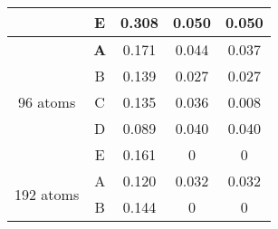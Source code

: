 \begin{table}[H]
\begin{tabular}{@{}ccccc@{}}
\multicolumn{1}{c|}{}                     & E          & 0.308                                                                         & 0.050                                                                         & 0.050                                                                          \\ \midrule
\multicolumn{1}{c|}{\multirow{5}{*}{96 atoms}}  & \textbf{A} & 0.171                                                                         & 0.044                                                                         & 0.037                                                                          \\
\multicolumn{1}{c|}{}                     & B          & 0.139                                                                         & 0.027                                                                         & 0.027                                                                          \\
\multicolumn{1}{c|}{}                     & C          & 0.135                                                                         & 0.036                                                                         & 0.008                                                                          \\
\multicolumn{1}{c|}{}                     & D          & 0.089                                                                         & 0.040                                                                         & 0.040                                                                          \\
\multicolumn{1}{c|}{}                     & E          & 0.161                                                                         & 0                                                                              & 0                                                                               \\ \midrule
\multicolumn{1}{c|}{\multirow{5}{*}{192 atoms}} & A          & 0.120                                                                         & 0.032                                                                         & 0.032                                                                          \\
\multicolumn{1}{c|}{}                     & B          & 0.144                                                                         & 0                                                                              & 0                                                                               \\

\end{tabular}
\end{table}
